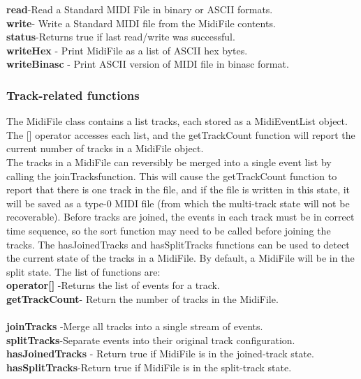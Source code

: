 \documentclass[12pt,a4paper]{article}
\begin{document}
\textbf{read}-Read a Standard MIDI File in binary or ASCII formats.\\
 \textbf{write}- Write a Standard MIDI file from the MidiFile contents.\\
\textbf{ status}-Returns true if last read/write was successful.\\
 \textbf{writeHex} - Print MidiFile as a list of ASCII hex bytes.\\
\textbf{writeBinasc} - Print ASCII version of MIDI file in binasc format.\\


\subsubsection{ Track-related functions}

The MidiFile class contains a list tracks, each stored as a MidiEventList object. The [] operator accesses each list, and the getTrackCount function will report the current number of tracks in a MidiFile object.\\



The tracks in a MidiFile can reversibly be merged into a single event list by calling the joinTracksfunction. This will cause the getTrackCount function to report that there is one track in the file, and if the file is written in this state, it will be saved as a type-0 MIDI file (from which the multi-track state will not be recoverable). Before tracks are joined, the events in each track must be in correct time sequence, so the sort function may need to be called before joining the tracks. The hasJoinedTracks and hasSplitTracks functions can be used to detect the current state of the tracks in a MidiFile. By default, a MidiFile will be in the split state. The list of functions are: \\
 \textbf{operator[]} -Returns the list of events for a track.\\
\textbf{ getTrackCount}- Return the number of tracks in the MidiFile.\\ \\
 \textbf{joinTracks }-Merge all tracks into a single stream of events.\\
\textbf{ splitTracks}-Separate events into their original track configuration. \\
 \textbf{hasJoinedTracks} - Return true if MidiFile is in the joined-track state.\\
 \textbf{hasSplitTracks}-Return true if MidiFile is in the split-track state.\\
\end{document}
